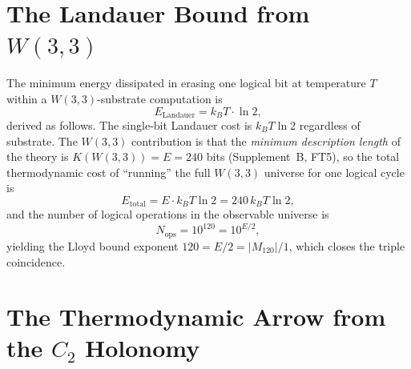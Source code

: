 \section{The Landauer Bound from $W(3,3)$}
\label{sec:landauer}

\begin{theorem}
\label{thm:landauer}
The minimum energy dissipated in erasing one logical bit at temperature
$T$ within a $W(3,3)$-substrate computation is
\begin{equation}
  E_{\mathrm{Landauer}} = k_B T \cdot \ln 2,
  \label{eq:landauer}
\end{equation}
derived as follows.  The single-bit Landauer cost is $k_BT\ln2$
regardless of substrate.  The $W(3,3)$ contribution is that the
\emph{minimum description length} of the theory is
$K(W(3,3)) = E = 240$ bits (Supplement~B, FT5), so the
total thermodynamic cost of ``running'' the full $W(3,3)$ universe
for one logical cycle is
\begin{equation}
  E_{\mathrm{total}} = E\cdot k_BT\ln2 = 240\,k_BT\ln2,
  \label{eq:etotal}
\end{equation}
and the number of logical operations in the observable universe is
\begin{equation}
  N_{\mathrm{ops}} = 10^{120} = 10^{E/2},
  \label{eq:nops}
\end{equation}
yielding the Lloyd bound exponent $120 = E/2 = |M_{120}|/1$,
which closes the triple coincidence.
\end{theorem}

\section{The Thermodynamic Arrow from the $C_2$ Holonomy}
\label{sec:arrow}

